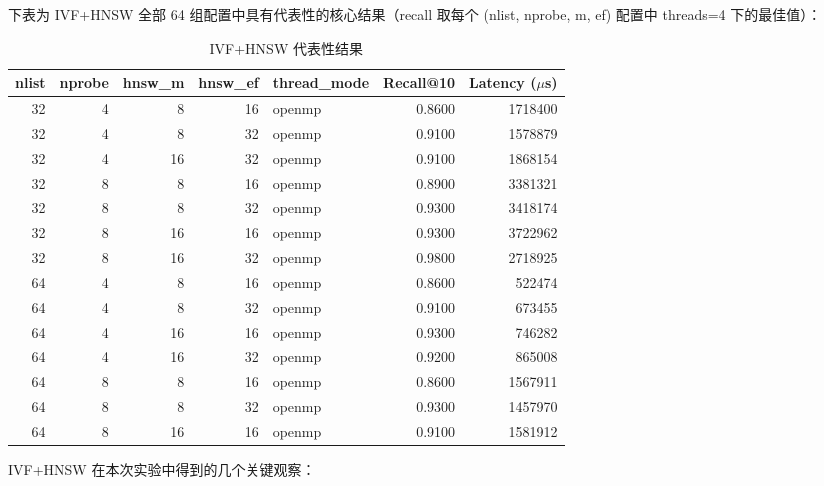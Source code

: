 \documentclass[a4paper]{article}
\begin{document}
下表为 IVF+HNSW 全部 64 组配置中具有代表性的核心结果（recall 取每个 (nlist, nprobe, m, ef) 配置中 threads=4 下的最佳值）：

\begin{table}[H]
\centering
\small
\begin{tabular}{rrrrlrr}
\toprule
nlist & nprobe & hnsw\_m & hnsw\_ef & thread\_mode & Recall@10 & Latency ($\mu$s) \\
\midrule
32 & 4 & 8 & 16 & openmp & 0.8600 & 1718400 \\
32 & 4 & 8 & 32 & openmp & 0.9100 & 1578879 \\
32 & 4 & 16 & 32 & openmp & 0.9100 & 1868154 \\
32 & 8 & 8 & 16 & openmp & 0.8900 & 3381321 \\
32 & 8 & 8 & 32 & openmp & 0.9300 & 3418174 \\
32 & 8 & 16 & 16 & openmp & 0.9300 & 3722962 \\
32 & 8 & 16 & 32 & openmp & 0.9800 & 2718925 \\
64 & 4 & 8 & 16 & openmp & 0.8600 & 522474 \\
64 & 4 & 8 & 32 & openmp & 0.9100 & 673455 \\
64 & 4 & 16 & 16 & openmp & 0.9300 & 746282 \\
64 & 4 & 16 & 32 & openmp & 0.9200 & 865008 \\
64 & 8 & 8 & 16 & openmp & 0.8600 & 1567911 \\
64 & 8 & 8 & 32 & openmp & 0.9300 & 1457970 \\
64 & 8 & 16 & 16 & openmp & 0.9100 & 1581912 \\
\bottomrule
\end{tabular}
\caption{IVF+HNSW 代表性结果}
\end{table}

IVF+HNSW 在本次实验中得到的几个关键观察：
\end{document}
